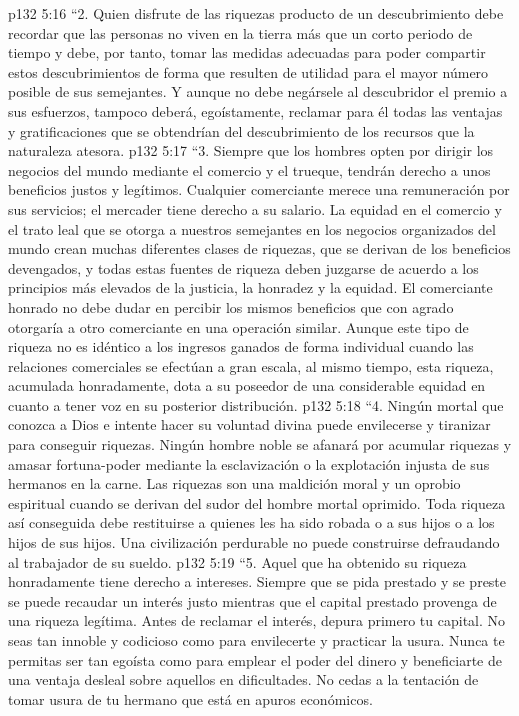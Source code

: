 \vs p132 5:16 \pc “2. Quien disfrute de las riquezas producto de un descubrimiento debe recordar que las personas no viven en la tierra más que un corto periodo de tiempo y debe, por tanto, tomar las medidas adecuadas para poder compartir estos descubrimientos de forma que resulten de utilidad para el mayor número posible de sus semejantes. Y aunque no debe negársele al descubridor el premio a sus esfuerzos, tampoco deberá, egoístamente, reclamar para él todas las ventajas y gratificaciones que se obtendrían del descubrimiento de los recursos que la naturaleza atesora.
\vs p132 5:17 \pc “3. Siempre que los hombres opten por dirigir los negocios del mundo mediante el comercio y el trueque, tendrán derecho a unos beneficios justos y legítimos. Cualquier comerciante merece una remuneración por sus servicios; el mercader tiene derecho a su salario. La equidad en el comercio y el trato leal que se otorga a nuestros semejantes en los negocios organizados del mundo crean muchas diferentes clases de riquezas, que se derivan de los beneficios devengados, y todas estas fuentes de riqueza deben juzgarse de acuerdo a los principios más elevados de la justicia, la honradez y la equidad. El comerciante honrado no debe dudar en percibir los mismos beneficios que con agrado otorgaría a otro comerciante en una operación similar. Aunque este tipo de riqueza no es idéntico a los ingresos ganados de forma individual cuando las relaciones comerciales se efectúan a gran escala, al mismo tiempo, esta riqueza, acumulada honradamente, dota a su poseedor de una considerable equidad en cuanto a tener voz en su posterior distribución.
\vs p132 5:18 \pc “4. Ningún mortal que conozca a Dios e intente hacer su voluntad divina puede envilecerse y tiranizar para conseguir riquezas. Ningún hombre noble se afanará por acumular riquezas y amasar fortuna\hyp{}poder mediante la esclavización o la explotación injusta de sus hermanos en la carne. Las riquezas son una maldición moral y un oprobio espiritual cuando se derivan del sudor del hombre mortal oprimido. Toda riqueza así conseguida debe restituirse a quienes les ha sido robada o a sus hijos o a los hijos de sus hijos. Una civilización perdurable no puede construirse defraudando al trabajador de su sueldo.
\vs p132 5:19 \pc “5. Aquel que ha obtenido su riqueza honradamente tiene derecho a intereses. Siempre que se pida prestado y se preste se puede recaudar un interés justo mientras que el capital prestado provenga de una riqueza legítima. Antes de reclamar el interés, depura primero tu capital. No seas tan innoble y codicioso como para envilecerte y practicar la usura. Nunca te permitas ser tan egoísta como para emplear el poder del dinero y beneficiarte de una ventaja desleal sobre aquellos en dificultades. No cedas a la tentación de tomar usura de tu hermano que está en apuros económicos.
